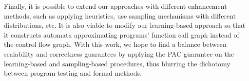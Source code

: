Finally, it is possible to extend our approaches with different enhancement methods, such as applying heuristics, use sampling mechanisms with different distributions, etc. It is also viable to modify our learning-based approach so that it constructs automata approximating programs' function call graph instead of the control flow graph. With this work, we hope to find a balance between scalability and correctness guarantees by applying the PAC guarantee on the learning-based and sampling-based procedures, thus blurring the dichotomy between program testing and formal methods. 


\begin{comment}

The number of iterations is perhaps the most important factor in our
recursion analysis technique (Table~\ref{table:experiments}) as it would
determine how many times of unwinding are applied.
We find that \textsc{CPAchecker} performs poorly when checking programs
that is unwound many times.
We however do not enable the more efficient block encoding in
\textsc{CPAchecker} for the ease of implementation.
One can improve the performance of our algorithm with the efficient but
complicated block encoding.
A bounded analyzer may also speed up the verification of bounded properties.

Our algorithm extracts function summaries from inductive invariants.
There are certainly many heuristics to optimize the computation of
function summaries.
For instance, some program analyzers return error traces when properties fail.
In particular, a valuation of formal parameters is obtained when
\textmd{CheckSummary} (Algorithm~\ref{algorithm:check-summary}) returns $\FF$.
If the valuation is not possible in the $\fun{main}$ function, one can use
its inductive invariant to refine function summaries.
We in fact exploit error traces computed by \textsc{CPAchecker} in the
implementation.

Another improvement on our algorithm is on selecting locations for extracting
inductive invariants.
In Algorithm~\ref{algorithm:mark-locations}, we select only outermost pairs of
locations for calls to the same function.
This is based on the observation that the unwound bodies of these function calls
contain more execution paths,
and hence their behaviors should be closer to the original function.
However, the extracted invariants in $s_i$ may be too precise to those certain
function calls and result in too coarse summary candidates constructed by
implication connective,
and consequently the candidates can not pass \textmd{CheckSummary} due to inner
function calls are not properly approximated.
Therefore, heuristics that select some locations of inner function calls may help
compute summary candidates with better quality.


\end{comment}
